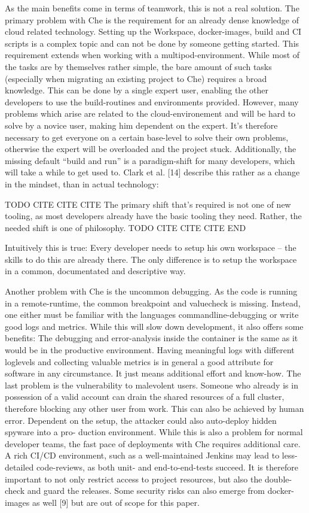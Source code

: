\documentclass[utf8,biblatex]{lni}
\begin{document}
As the main benefits come in terms of teamwork, this is not a real solution.
The primary problem with Che is the requirement for an already dense knowledge of cloud related technology.
Setting up the Workspace, docker-images, build and CI scripts is a complex topic and can not be done by someone getting started. 
This requirement extends when working with a multipod-environment. 
While most of the tasks are by themselves rather simple, the bare amount of such tasks (especially when migrating an existing project to Che) requires a broad knowledge.
This can be done by a single expert user, enabling the other developers  to  use  the  build-routines and  environments provided. 
However, many problems which arise are related to the cloud-environement and will be hard to solve by a novice user, making him dependent on the expert. 
It's therefore necessary to get everyone on a certain base-level to solve their own problems, otherwise the expert will be overloaded and the project stuck.  
Additionally, the missing default “build and run” is a paradigm-shift for many developers, which will take a while to get used to. 
Clark et al. [14] describe this rather as a change in the mindset, than in actual technology: 

TODO CITE CITE CITE
The primary shift that’s required is not one of new tooling, as most developers already have the basic tooling they need. 
Rather, the needed shift is one of philosophy. 
TODO CITE CITE CITE END

Intuitively this is true: Every developer needs to setup his own workspace – the skills to do this are already there. 
The only difference is to setup the workspace in a common, documentated and descriptive way. 

Another problem with Che is the uncommon debugging. 
As the code is running in a remote-runtime, the common breakpoint  and  valuecheck
is  missing.  
Instead,  one  either must be familiar with the languages commandline-debugging or write good logs and metrics. 
While this will slow down development, it also offers some benefits: 
The debugging and error-analysis inside the container is the same as it would be in the productive environment. 
Having meaningful logs with different loglevels and collecting valuable metrics is 
in general a good attribute for software in any circumstance. 
It just means additional effort and know-how.  
The last problem is the vulnerability to malevolent users. 
Someone who already is in possession of a valid account can drain the shared resources of a full cluster, therefore blocking  any  other  user  from  work.
This  can  also  be achieved by human error. 
Dependent on the setup, the attacker could also auto-deploy hidden spyware into a pro-
duction environment. 
While this is also a problem for normal developer teams, the fast pace of deployments with Che requires additional care. 
A rich CI/CD environment, such as a well-maintained Jenkins may lead to less-detailed code-reviews, as both unit- and end-to-end-tests succeed.  
It is therefore important to not only restrict access to project resources, but also the double-check and guard the releases.  
Some security risks can also emerge from docker-images as well [9] but are out of scope for this paper.
\end{document}
